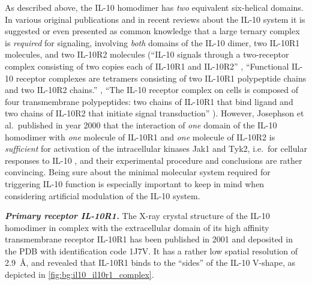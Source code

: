 As described above, the IL-10 homodimer has \textit{two} equivalent six-helical
domains. In various original publications and in recent reviews about the IL-10
system it is suggested or even presented as common knowledge that a large
ternary complex is \textit{required} for signaling, involving \textit{both}
domains of the IL-10 dimer, two IL-10R1 molecules, and two IL-10R2 molecules
(\enquote{IL-10 signals through a two-receptor complex consisting of two copies
each of IL-10R1 and IL-10R2} \cite{mosser_il10_newperspectives_2008},
\enquote{Functional IL-10 receptor complexes are tetramers consisting
of two IL-10R1 polypeptide chains and two IL-10R2 chains.}
\cite{donnelly_finbloom_il10_1999}, \enquote{The IL-10 receptor complex on cells
is composed of four transmembrane polypeptides: two chains of IL-10R1 that bind
ligand and two chains of IL-10R2 that initiate signal transduction}
\cite{pestka_2004_il10_receptors_review}). However, Josephson et al.\ published
in year 2000 that the interaction of \textit{one} domain of the IL-10 homodimer
with \textit{one} molecule of IL-10R1 and \textit{one} molecule of IL-10R2 is
\textit{sufficient} for activation of the intracellular kinases Jak1 and Tyk2,
i.e.\ for cellular responses to IL-10 \cite{il10_monomer_2000}, and their
experimental procedure and conclusions are rather convincing. Being sure about
the minimal molecular system required for triggering IL-10 function is
especially important to keep in mind when considering artificial modulation of
the IL-10 system.

\vspace{0.5cm}
\textit{\textbf{Primary receptor IL-10R1.}} The X-ray crystal structure of the
IL-10 homodimer in complex with the extracellular domain of its high affinity
transmembrane receptor IL-10R1 has been published in 2001 \cite{Josephson2001}
and deposited in the PDB with identification code 1J7V. It has a rather low
spatial resolution of \SI{2.9}{\angstrom}, and revealed that IL-10R1 binds to
the \enquote{sides} of the IL-10 V-shape, as depicted in
\cref{fig:bg:il10_il10r1_complex}.

